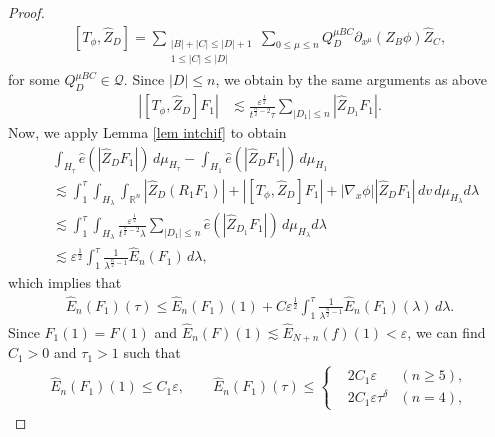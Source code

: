 \documentclass{article}
\newcommand{\bbr}{{\mathbb R}}
\newcommand{\bbrn}{{\bbr^n}}
\newcommand{\cQ}{{\mathcal Q}}
\begin{document}
\begin{proof}
\begin{align*}
\left[ T_\phi , \hat{ Z }_D \right] = \sum_{ \substack{ | B | + | C | \leq | D | + 1 \\ 1 \leq | C | \leq | D | } } \sum_{ 0 \leq \mu \leq n } Q^{ \mu B C }_{ D } \partial_{ x^\mu } ( Z_B \phi ) \hat{ Z }_C ,
\end{align*}
for some $ Q^{ \mu B C }_{ D } \in \cQ $. Since $ | D | \leq n $, we obtain by the same arguments as above
\begin{align*}
\left| \left[ T_\phi , \hat{ Z }_D \right] F_1 \right| & \lesssim \frac{ \varepsilon^{ \frac{ 1 }{ 2 } } }{ t^{ \frac{ n }{ 2 } - 2 } \tau } \sum_{ | D_1 | \leq n } | \hat{ Z }_{ D_1 } F_1 | .
\end{align*}
Now, we apply Lemma \ref{lem intchif} to obtain
\begin{align*}
& \int_{ H_\tau } \hat{ e } ( | \hat{ Z }_D F_1 | ) \, d \mu_{ H_\tau } - \int_{ H_1 } \hat{ e } ( | \hat{ Z }_D F_1 | ) \, d \mu_{ H_1 } \\
& \lesssim \int_1^\tau \int_{ H_\lambda } \int_\bbrn | \hat{ Z }_D ( R_1 F_1 ) | + \left| \left[ T_\phi , \hat{ Z }_D \right] F_1 \right| + | \nabla_x \phi | | \hat{ Z }_D F_1 | \, d v \, d \mu_{ H_\lambda } d \lambda \\
& \lesssim \int_1^\tau \int_{ H_\lambda } \frac{ \varepsilon^{ \frac{ 1 }{ 2 } } }{ t^{ \frac{ n }{ 2 } - 2 } \lambda } \sum_{ | D_1 | \leq n } \hat{ e } ( | \hat{ Z }_{ D_1 } F_1 | ) \, d \mu_{ H_\lambda } d \lambda \\
& \lesssim \varepsilon^{ \frac{ 1 }{ 2 } } \int_1^\tau \frac{ 1 }{ \lambda^{ \frac{ n }{ 2 } - 1 } } \hat{ E }_n ( F_1 ) \, d \lambda ,
\end{align*}
which implies that
\begin{align}
\hat{ E }_n ( F_1 ) ( \tau ) \leq \hat{ E }_n ( F_1 ) ( 1 ) + C \varepsilon^{ \frac{ 1 }{ 2 } } \int_1^\tau \frac{ 1 }{ \lambda^{ \frac{ n }{ 2 } - 1 } } \hat{ E }_n ( F_1 ) ( \lambda ) \, d \lambda . \label{FGronwall}
\end{align}
Since $ F_1 ( 1 ) = F ( 1 ) $ and $ \hat{ E }_n ( F ) ( 1 ) \lesssim \hat{ E }_{ N + n } ( f ) ( 1 ) < \varepsilon $, we can find $ C_{ 1 } > 0 $ and $ \tau_{ 1 } > 1 $ such that
\begin{align}
\hat{ E }_n ( F_1 ) ( 1 ) \leq C_{ 1 } \varepsilon , \qquad \hat{ E }_n ( F_1 ) ( \tau ) \leq
\left\{
\begin{aligned}
& 2 C_{ 1 } \varepsilon & ( n \geq 5 ) , \\
& 2 C_{ 1 } \varepsilon \tau^\delta & ( n = 4 ) ,

\end{aligned}
\end{align}
\end{proof}
\end{document}
